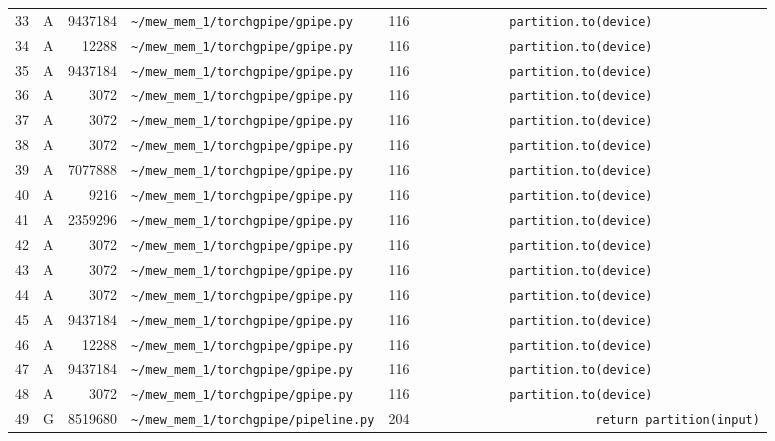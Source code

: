 \documentclass{article}
\begin{document}
\begin{longtable}{r l r p{6.5cm} r p{7.0cm}}
33 & A & 9437184 & \lstinline|~/mew_mem_1/torchgpipe/gpipe.py| & 116 & \lstinline|            partition.to(device)| \\
34 & A & 12288 & \lstinline|~/mew_mem_1/torchgpipe/gpipe.py| & 116 & \lstinline|            partition.to(device)| \\
35 & A & 9437184 & \lstinline|~/mew_mem_1/torchgpipe/gpipe.py| & 116 & \lstinline|            partition.to(device)| \\
36 & A & 3072 & \lstinline|~/mew_mem_1/torchgpipe/gpipe.py| & 116 & \lstinline|            partition.to(device)| \\
37 & A & 3072 & \lstinline|~/mew_mem_1/torchgpipe/gpipe.py| & 116 & \lstinline|            partition.to(device)| \\
38 & A & 3072 & \lstinline|~/mew_mem_1/torchgpipe/gpipe.py| & 116 & \lstinline|            partition.to(device)| \\
39 & A & 7077888 & \lstinline|~/mew_mem_1/torchgpipe/gpipe.py| & 116 & \lstinline|            partition.to(device)| \\
40 & A & 9216 & \lstinline|~/mew_mem_1/torchgpipe/gpipe.py| & 116 & \lstinline|            partition.to(device)| \\
41 & A & 2359296 & \lstinline|~/mew_mem_1/torchgpipe/gpipe.py| & 116 & \lstinline|            partition.to(device)| \\
42 & A & 3072 & \lstinline|~/mew_mem_1/torchgpipe/gpipe.py| & 116 & \lstinline|            partition.to(device)| \\
43 & A & 3072 & \lstinline|~/mew_mem_1/torchgpipe/gpipe.py| & 116 & \lstinline|            partition.to(device)| \\
44 & A & 3072 & \lstinline|~/mew_mem_1/torchgpipe/gpipe.py| & 116 & \lstinline|            partition.to(device)| \\
45 & A & 9437184 & \lstinline|~/mew_mem_1/torchgpipe/gpipe.py| & 116 & \lstinline|            partition.to(device)| \\
46 & A & 12288 & \lstinline|~/mew_mem_1/torchgpipe/gpipe.py| & 116 & \lstinline|            partition.to(device)| \\
47 & A & 9437184 & \lstinline|~/mew_mem_1/torchgpipe/gpipe.py| & 116 & \lstinline|            partition.to(device)| \\
48 & A & 3072 & \lstinline|~/mew_mem_1/torchgpipe/gpipe.py| & 116 & \lstinline|            partition.to(device)| \\
49 & G & 8519680 & \lstinline|~/mew_mem_1/torchgpipe/pipeline.py| & 204 & \lstinline|                        return partition(input)| \\

\end{longtable}
\end{document}
